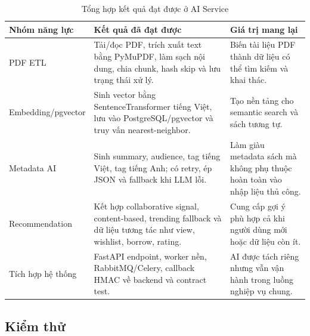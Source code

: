 \begin{table}[H]
\centering
\small
\begin{tabularx}{\textwidth}{|p{3.4cm}|X|p{3.5cm}|}
\hline
\textbf{Nhóm năng lực} & \textbf{Kết quả đã đạt được} & \textbf{Giá trị mang lại} \\
\hline
PDF ETL &
Tải/đọc PDF, trích xuất text bằng PyMuPDF, làm sạch nội dung, chia chunk, hash skip và lưu trạng thái xử lý. &
Biến tài liệu PDF thành dữ liệu có thể tìm kiếm và khai thác. \\
\hline
Embedding/pgvector &
Sinh vector bằng SentenceTransformer tiếng Việt, lưu vào PostgreSQL/pgvector và truy vấn nearest-neighbor. &
Tạo nền tảng cho semantic search và sách tương tự. \\
\hline
Metadata AI &
Sinh summary, audience, tag tiếng Việt, tag tiếng Anh; có retry, ép JSON và fallback khi LLM lỗi. &
Làm giàu metadata sách mà không phụ thuộc hoàn toàn vào nhập liệu thủ công. \\
\hline
Recommendation &
Kết hợp collaborative signal, content-based, trending fallback và dữ liệu tương tác như view, wishlist, borrow, rating. &
Cung cấp gợi ý phù hợp cả khi người dùng mới hoặc dữ liệu còn ít. \\
\hline
Tích hợp hệ thống &
FastAPI endpoint, worker nền, RabbitMQ/Celery, callback HMAC về backend và contract test. &
AI được tách riêng nhưng vẫn vận hành trong luồng nghiệp vụ chung. \\
\hline
\end{tabularx}
\caption{Tổng hợp kết quả đạt được ở AI Service}
\label{tab:conclusion_ai_results}
\end{table}

\subsection{Kiểm thử}

